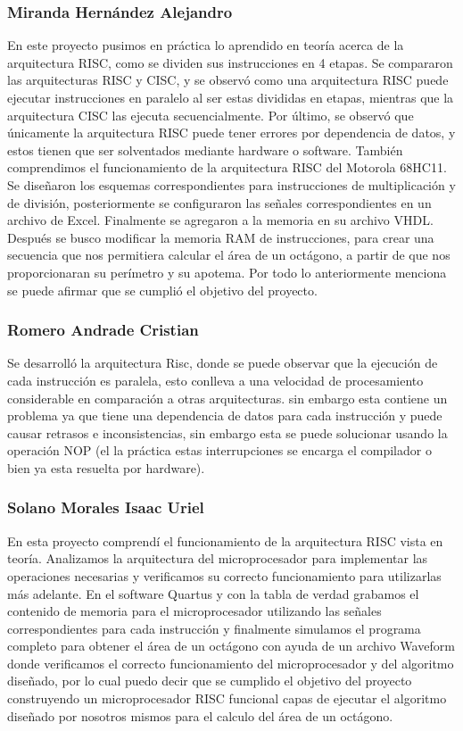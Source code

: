 \documentclass{IEEEtran}
\begin{document}
\subsubsection{Miranda Hernández Alejandro}
\label{sec:org5d47214}
En este proyecto pusimos en práctica lo aprendido en teoría acerca de la arquitectura RISC, como se dividen sus instrucciones en 4 etapas. Se compararon las arquitecturas RISC y CISC, y se observó como una arquitectura RISC puede ejecutar instrucciones en paralelo al ser estas divididas en etapas, mientras que la arquitectura CISC las ejecuta secuencialmente. Por último, se observó que únicamente la arquitectura RISC puede tener errores por dependencia de datos, y estos tienen que ser solventados mediante hardware o software.
También comprendimos el funcionamiento de la arquitectura RISC del Motorola 68HC11. Se diseñaron los esquemas correspondientes para instrucciones de multiplicación y de división, posteriormente se configuraron las señales correspondientes en un archivo de Excel. Finalmente se agregaron a la memoria en su archivo VHDL.
Después se busco modificar la memoria RAM de instrucciones, para crear una secuencia que nos permitiera calcular el área de un octágono, a partir de que nos proporcionaran su perímetro y su apotema. Por todo lo anteriormente menciona se puede afirmar que se cumplió el objetivo del proyecto.


\subsubsection{Romero Andrade Cristian}
\label{sec:orgeff4059}
Se desarrolló la arquitectura Risc, donde se puede observar que la ejecución de cada instrucción es paralela, esto conlleva a una velocidad de procesamiento considerable en comparación a otras arquitecturas. sin embargo esta contiene un problema ya que tiene una dependencia de datos para cada instrucción y puede causar retrasos e inconsistencias, sin embargo esta se puede solucionar usando la operación NOP (el la práctica estas interrupciones se encarga el compilador o bien ya esta resuelta por hardware).

\subsubsection{Solano Morales Isaac Uriel}
\label{sec:org6ca88ac}
En esta proyecto comprendí el funcionamiento de la arquitectura RISC vista en teoría. Analizamos la arquitectura del microprocesador para implementar las operaciones necesarias y verificamos su correcto funcionamiento para utilizarlas más adelante. En el software Quartus y con la tabla de verdad grabamos el contenido de memoria para el microprocesador utilizando las señales correspondientes para cada instrucción y finalmente simulamos el programa completo para obtener el área de un octágono con ayuda de un archivo Waveform donde verificamos el correcto funcionamiento del microprocesador y del algoritmo diseñado, por lo cual puedo decir que se cumplido el objetivo del proyecto construyendo un microprocesador RISC funcional capas de ejecutar el algoritmo diseñado por nosotros mismos para el calculo del área de un octágono.
\end{document}
